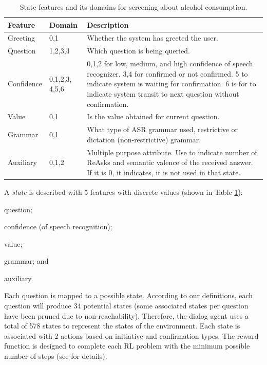 \documentclass[letterpaper]{article}
\begin{document}
\begin{table}[!ht]
\caption{State features and its domains for screening about alcohol consumption.}
\label{FeaturesRepresentation}
\begin{tabular}{ | p{14mm} | p{11mm} | p{48mm} | } \hline
    \textbf{Feature} & \textbf{Domain} & \textbf{Description} \\ \hline
    Greeting   & 0,1              & Whether the system has greeted the user. \\ \hline
    Question   & 1,2,3,4          & Which question is being queried.\\ \hline
    Confidence & 0,1,2,3, 4,5,6 & 0,1,2 for low, medium, and high confidence of speech recognizer. 3,4 for
                                  confirmed or not confirmed. 5 to indicate system is waiting for confirmation. 
                                  6 is for to indicate system transit to next question without confirmation.\\ \hline
    Value      & 0,1            & Is the value obtained for current question.\\ \hline
    Grammar    & 0,1            & What type of ASR grammar used, restrictive or dictation (non-restrictive) 
                                  grammar.  \\ \hline
    Auxiliary  & 0,1,2          & Multiple purpose attribute. Use to indicate number of ReAsks and semantic 
                                  valence of the received answer. If it is 0, it indicates, it is not used in 
                                  that state.  \\ \hline
\end{tabular}
\end{table}


A {\em state} is described with 5 features with discrete values (shown in Table 
\ref{FeaturesRepresentation}): \begin{inparaenum}[1)] \item question; 
\item confidence (of speech recognition); \item value; \item grammar; and \item auxiliary. \end{inparaenum} Each 
question is mapped to a possible state. According to our definitions, each question will produce 34 
potential states (some associated states per question have been pruned due to non-reachability). 
Therefore, the dialog agent uses a total of 578 states to represent the states of the environment. Each 
state is associated with 2 actions based on initiative and  confirmation types. The reward 
function is designed to complete each RL problem with the minimum possible number of steps (see \cite{YASCLL14} for details).  
\end{document}
